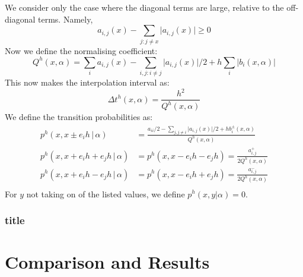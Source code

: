 \documentclass[11pt,draftd]{article}
\begin{document}
We consider only the case where the diagonal terms are large, relative to the off-diagonal terms. Namely, 
\begin{equation*} 
  a_{i,j}(x) - \sum_{j:j\ne x}\lvert a_{i,j}(x) \rvert \ge 0 
\end{equation*} 
Now we define the normalising coefficient: 
\begin{equation*} 
  Q^{h}(x,\alpha) = \sum_{i}a_{i,j}(x) - \sum_{i,j:i\ne j}\lvert a_{i,j}(x) \rvert/2 + h\sum_{i}\lvert b_{i}(x,\alpha) \rvert 
\end{equation*} 
This now makes the interpolation interval as: 
\begin{equation*} 
  \Delta t^{h}(x,\alpha) = \frac{h^{2}}{Q^{h}(x,\alpha)} 
\end{equation*} 
We define the transition probabilities as: 
\begin{align*} 
  p^{h}(x, x\pm e_{i}h \,\vert\, \alpha) &= \frac{a_{ii}/2 - \sum_{j, j\ne i} \lvert a_{i,j}(x) \rvert /2 + hb_{i}^{\pm}(x,\alpha)  }{Q^{h}(x,\alpha)} \\ 
  p^{h}(x, x + e_{i}h + e_{j}h \,\vert\, \alpha) &= p^{h}(x, x - e_{i}h - e_{j}h) = \frac{a_{i,j}^{+}}{2Q^{h}(x,\alpha)} \\ 
  p^{h}(x, x + e_{i}h - e_{j}h \,\vert\, \alpha) &= p^{h}(x, x - e_{i}h + e_{j}h) = \frac{a_{i,j}^{-}}{2Q^{h}(x,\alpha)} \\ 
\end{align*} 
For $ y $ not taking on of the listed values, we define $ p^{h}(x,y\vert \alpha) = 0$. 
\subsubsection{title} 

\newpage

\section{Comparison and Results}
\end{document}
